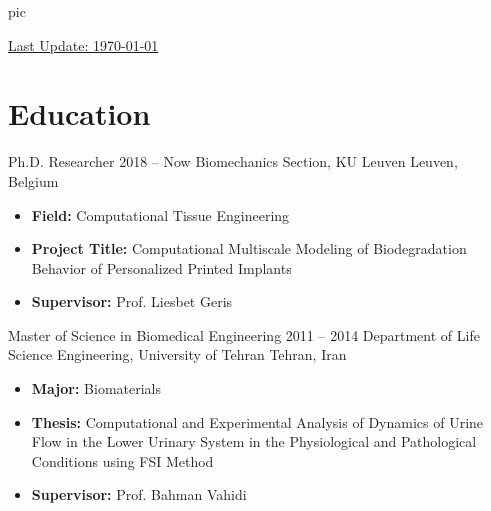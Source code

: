\documentclass{cv}
\begin{document}
{{pic}}


\noindent
{\footnotesize  \underline{Last Update: \today{}}}





\section{Education}

\longdatedsubsection
{Ph.D. Researcher}
{2018 -- Now} 
{Biomechanics Section, KU Leuven} 
{Leuven, Belgium} 

\begin{itemize}

\item 
\textbf{Field:} Computational Tissue Engineering

\item
\textbf{Project Title:} Computational Multiscale Modeling of Biodegradation Behavior of Personalized Printed Implants

\item
\textbf{Supervisor:} Prof. Liesbet Geris

\end{itemize}

\longdatedsubsection
{Master of Science in Biomedical Engineering}
{2011 -- 2014} 
{Department of Life Science Engineering, University of Tehran} 
{Tehran, Iran} 

\begin{itemize}

\item 
\textbf{Major:} Biomaterials

\item
\textbf{Thesis:} Computational and Experimental Analysis of Dynamics of Urine Flow in the Lower Urinary System in the Physiological and Pathological Conditions using FSI Method

\item
\textbf{Supervisor:} Prof. Bahman Vahidi


\end{itemize}
\end{document}
